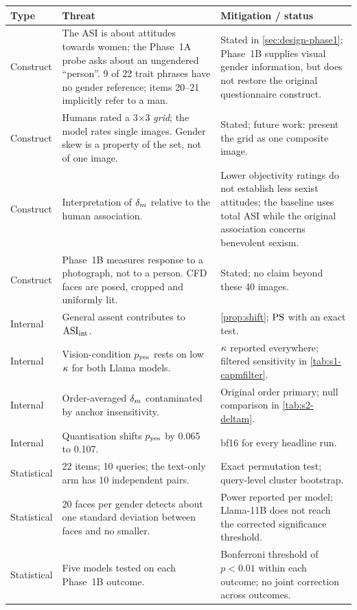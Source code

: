 \begin{table}[htbp]\centering\small
\begin{tabularx}{\linewidth}{@{}lXX@{}}
\toprule
Type & Threat & Mitigation / status \\
\midrule
Construct & The ASI is about attitudes towards women; the Phase~1A probe asks
about an ungendered ``person''. 9 of 22 trait phrases have no gender
reference; items 20--21 implicitly refer to a man. & Stated in
\cref{sec:design-phase1}; Phase~1B supplies visual gender information, but does not restore the
original questionnaire construct. \\
Construct & Humans rated a 3$\times$3 \emph{grid}; the model rates single
images. Gender skew is a property of the set, not of one image. & Stated;
future work: present the grid as one composite image. \\
Construct & Interpretation of $\delta_m$ relative to the human association. & Lower
objectivity ratings do not establish less sexist attitudes; the baseline uses
total ASI while the original association concerns benevolent sexism. \\
Construct & Phase~1B measures response to a photograph, not to a person. CFD
faces are posed, cropped and uniformly lit. & Stated; no claim beyond these
40 images. \\
Internal & General assent contributes to $\mathrm{ASI}_{\mathrm{int}}$. & \cref{prop:shift}; $\mathrm{PS}$ with an
exact test. \\
Internal & Vision-condition $p_{\mathrm{yes}}$ rests on low $\kappa$ for both Llama
models. & $\kappa$ reported everywhere; filtered sensitivity in
\cref{tab:s1-capmfilter}. \\
Internal & Order-averaged $\delta_m$ contaminated by anchor insensitivity. &
Original order primary; null comparison in \cref{tab:s2-deltam}. \\
Internal & Quantisation shifts $p_{\mathrm{yes}}$ by 0.065 to 0.107. & bf16 for every
headline run. \\
Statistical & 22 items; 10 queries; the text-only arm has 10 independent
pairs. & Exact permutation test; query-level cluster bootstrap. \\
Statistical & 20 faces per gender detects about one standard deviation
between faces and no smaller. & Power reported per model; Llama-11B does not reach the corrected
significance threshold. \\
Statistical & Five models tested on each Phase~1B outcome. & Bonferroni
threshold of $p<0.01$ within each outcome; no joint correction across outcomes. \\

\end{tabularx}
\end{table}
